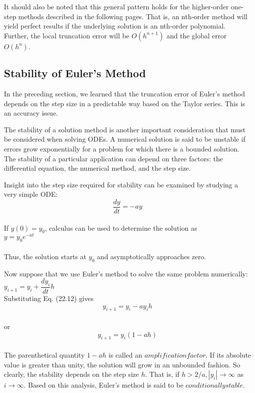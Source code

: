 \documentclass[../main.tex]{subfiles}
\begin{document}
It should also be noted that this general pattern holds for the higher-order one-step
methods described in the following pages. That is, an nth-order method will yield perfect
results if the underlying solution is an nth-order polynomial. Further, the local truncation
error will be $O(h^{n+1})$ and the global error $O(h^n)$.

\subsection{Stability of Euler's Method}
In the preceding section, we learned that the truncation error of Euler's method depends on
the step size in a predictable way based on the Taylor series. This is an accuracy issue.

The stability of a solution method is another important consideration that must be considered when solving ODEs. A numerical solution is said to be unstable if errors grow
exponentially for a problem for which there is a bounded solution. The stability of a particular application can depend on three factors: the differential equation, the numerical
method, and the step size.

Insight into the step size required for stability can be examined by studying a very
simple ODE:\\
\begin{equation}
\tag{22.12}
\dfrac{dy}{dt} = -ay
\end{equation}\\
If $y(0) = y_{0}$, calculus can be used to determine the solution as\\

$y=y_{0}e^{-at}$\\
\\
Thus, the solution starts at $y_{0}$ and asymptotically approaches zero.

Now suppose that we use Euler's method to solve the same problem numerically:\\

$y_{i+1} = y_{i} + \dfrac{dy_{i}}{dt} h$
\\
Substituting Eq. (22.12) gives\\

$$y_{i+1} = y_{i} - ay_{i}h$$\\
or\\
\begin{equation}
\tag{22.13}
y_{i+1} = y_{i}(1-ah)
\end{equation}\\
The parenthetical quantity $1 − ah$ is called an $amplification factor$. If its absolute value is
greater than unity, the solution will grow in an unbounded fashion. So clearly, the stability
depends on the step size $h$. That is, if $ h > 2/a, |y_{i}| \rightarrow \infty$ as $ i \rightarrow \infty $. Based on this analysis, Euler's method is said to be $conditionally stable$.
\end{document}
